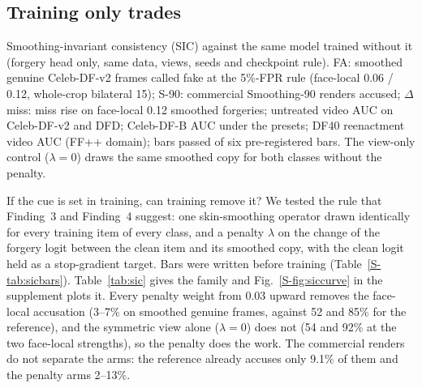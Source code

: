 \documentclass[conference]{IEEEtran}
\begin{document}
\subsection{Training only trades}
\label{sec:sic}
\begin{table}[t]
\centering
\caption{Smoothing-invariant consistency (SIC) against the same model trained without it (forgery head only, same data,
views, seeds and checkpoint rule). FA: smoothed genuine Celeb-DF-v2 frames called fake at the 5\%-FPR rule (face-local 0.06 /
0.12, whole-crop bilateral 15); S-90: commercial Smoothing-90 renders accused; $\Delta$miss: miss rise on face-local 0.12
smoothed forgeries; untreated video AUC on Celeb-DF-v2 and DFD; Celeb-DF-B AUC under the presets; DF40 reenactment video AUC
(FF++ domain); bars passed of six pre-registered bars. The view-only control ($\lambda=0$) draws the same smoothed copy for
both classes without the penalty.}
\label{tab:sic}
\footnotesize
\begin{adjustbox}{max width=\textwidth}\end{adjustbox}
\end{table}

If the cue is set in training, can training remove it? We tested the rule that Finding~3 and Finding~4 suggest: one
skin-smoothing operator drawn identically for every training item of every class, and a penalty $\lambda$ on the change of
the forgery logit between the clean item and its smoothed copy, with the clean logit held as a stop-gradient target. Bars
were written before training (Table~\ref{S-tab:sicbars}). Table~\ref{tab:sic} gives the family and Fig.~\ref{S-fig:siccurve} in the supplement plots it. Every penalty
weight from 0.03 upward removes the face-local accusation (3--7\% on smoothed genuine frames, against 52 and 85\% for the
reference), and the symmetric view alone ($\lambda=0$) does not (54 and 92\% at the two face-local strengths), so the
penalty does the work. The commercial renders do not separate the arms: the reference already accuses only 9.1\% of them
and the penalty arms 2--13\%.

\end{document}
